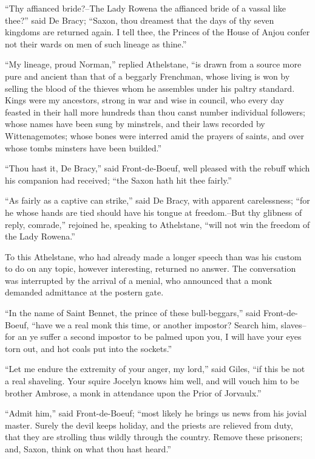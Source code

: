 ``Thy affianced bride?--The Lady Rowena the affianced bride of a vassal
like thee?'' said De Bracy; ``Saxon, thou dreamest that the days of thy
seven kingdoms are returned again. I tell thee, the Princes of the House
of Anjou confer not their wards on men of such lineage as thine.''

``My lineage, proud Norman,'' replied Athelstane, ``is drawn from a
source more pure and ancient than that of a beggarly Frenchman, whose
living is won by selling the blood of the thieves whom he assembles
under his paltry standard. Kings were my ancestors, strong in war and
wise in council, who every day feasted in their hall more hundreds than
thou canst number individual followers; whose names have been sung by
minstrels, and their laws recorded by Wittenagemotes; whose bones were
interred amid the prayers of saints, and over whose tombs minsters have
been builded.''

``Thou hast it, De Bracy,'' said Front-de-Boeuf, well pleased with the
rebuff which his companion had received; ``the Saxon hath hit thee
fairly.''

``As fairly as a captive can strike,'' said De Bracy, with apparent
carelessness; ``for he whose hands are tied should have his tongue at
freedom.--But thy glibness of reply, comrade,'' rejoined he, speaking to
Athelstane, ``will not win the freedom of the Lady Rowena.''

To this Athelstane, who had already made a longer speech than was his
custom to do on any topic, however interesting, returned no answer. The
conversation was interrupted by the arrival of a menial, who announced
that a monk demanded admittance at the postern gate.

``In the name of Saint Bennet, the prince of these bull-beggars,'' said
Front-de-Boeuf, ``have we a real monk this time, or another impostor?
Search him, slaves--for an ye suffer a second impostor to be palmed upon
you, I will have your eyes torn out, and hot coals put into the
sockets.''

``Let me endure the extremity of your anger, my lord,'' said Giles, ``if
this be not a real shaveling. Your squire Jocelyn knows him well, and
will vouch him to be brother Ambrose, a monk in attendance upon the
Prior of Jorvaulx.''

``Admit him,'' said Front-de-Boeuf; ``most likely he brings us news from
his jovial master. Surely the devil keeps holiday, and the priests are
relieved from duty, that they are strolling thus wildly through the
country. Remove these prisoners; and, Saxon, think on what thou hast
heard.''

